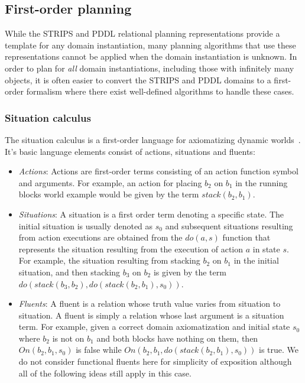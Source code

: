 \subsection{First-order planning}

While the STRIPS and PDDL relational planning representations provide a template 
for any domain instantiation, many planning algorithms that use these representations
cannot be applied when the domain instantiation is unknown.  In order to plan for
\emph{all} domain instantiations, including those with infinitely many objects,
it is often easier to convert the STRIPS and PDDL domains to a
first-order formalism where there exist well-defined algorithms to handle
these cases.

\subsubsection{Situation calculus}

The situation calculus is a first-order language for
axiomatizing dynamic worlds~\cite{mccarthy63}.   It's basic language elements
consist of actions, situations and fluents:

\begin{itemize}

\item \emph{Actions}: Actions are first-order terms consisting of an
action function symbol and arguments.  For example, an action
for placing $b_2$ on $b_1$ in the running blocks world example would be
given by the term $stack(b_2, b_1)$.

\item \emph{Situations}: A situation is a first order term denoting
a specific state.  The initial situation is usually denoted as $s_0$ and
subsequent situations resulting from action executions are obtained
from the $do(a,s)$ function that represents the situation resulting from the execution 
of action $a$ in state $s$.
For example, the situation resulting
from stacking $b_2$ on $b_1$ in the initial situation, and then stacking
$b_3$ on $b_2$ is given by the term \mbox{$do(stack(b_3,b_2),do(stack(b_2,b_1),s_0))$}.

\item \emph{Fluents}: A fluent is a relation whose truth value varies from
situation to situation.  A fluent is simply a relation
whose last argument is a situation term.  For example, given a correct
domain axiomatization and initial state $s_0$ where $b_2$ is not on
$b_1$ and both blocks have nothing on them, then $On(b_2,b_1,s_0)$ is
false while $On(b_2,b_1,do(stack(b_2,b_1),s_0))$ is true.  We do not
consider functional fluents here for simplicity of exposition although
all of the following ideas still apply in this case.

\end{itemize}

